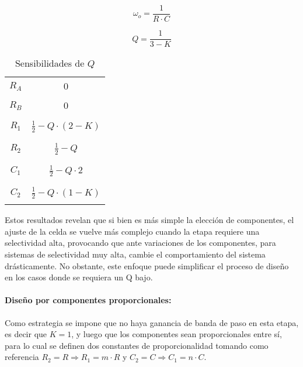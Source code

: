 \begin{equation}
    \omega_o = \frac{1}{R \cdot C}
    \label{eq:wo_ajuste_componentes_iguales}
\end{equation}

\begin{equation}
    Q = \frac{1}{3 - K}
    \label{eq:q_ajuste_componentes_iguales}
\end{equation}

\begin{table}[H]
    \centering
    \begin{tabular}{c | c}
        \hline \\
        $R_A$ & $0$ \\
        \\ \hline \\
        $R_B$ & $0$ \\ 
        \\ \hline \\
        $R_1$ & $\frac{1}{2} - Q \cdot (2 - K)$ \\
        \\ \hline \\
        $R_2$ & $\frac{1}{2} - Q$ \\
        \\ \hline \\
        $C_1$ & $\frac{1}{2} - Q \cdot 2$ \\
        \\ \hline \\
        $C_2$ & $\frac{1}{2} - Q \cdot (1 - K) $ \\
        \\ \hline
    \end{tabular}
    \caption{Sensibilidades de $Q$}
\end{table}

Estos resultados revelan que si bien es m\'as simple la elecci\'on de componentes, el ajuste de la celda se vuelve m\'as complejo cuando la etapa requiere una selectividad alta,
provocando que ante variaciones de los componentes, para sistemas de selectividad muy alta, cambie el comportamiento del sistema dr\'asticamente. No obstante, este enfoque puede simplificar
el proceso de dise\~no en los casos donde se requiera un Q bajo.

\paragraph{Dise\~no por componentes proporcionales:} Como estrategia se impone que no haya ganancia de banda de paso en esta etapa, es decir que $K = 1$, y luego que los componentes sean proporcionales
entre s\'i, para lo cual se definen dos constantes de proporcionalidad tomando como referencia $R_2 = R \Rightarrow R_1 = m \cdot R$ y $C_2 = C \Rightarrow C_1 = n \cdot C$.

